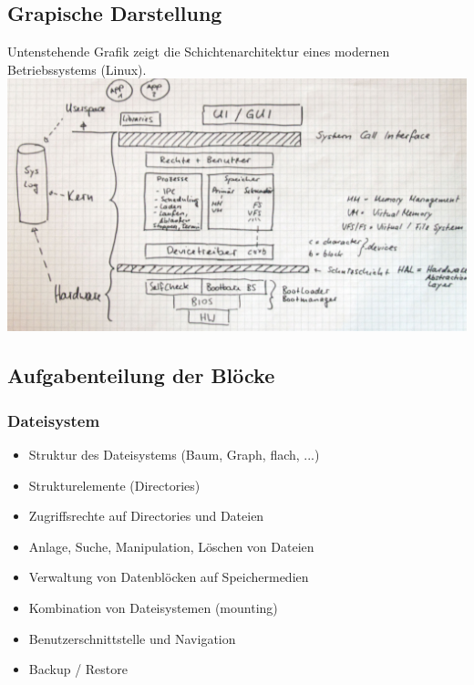 \documentclass[a4paper, 10pt]{article}
\begin{document}
\subsection{Grapische Darstellung}
Untenstehende Grafik zeigt die Schichtenarchitektur eines modernen Betriebssystems (Linux).\\
\includegraphics[scale=0.15]{Bsys.jpg}\\

\subsection{Aufgabenteilung der Bl\"ocke}
\subsubsection{Dateisystem}
\begin{itemize}
\item Struktur des Dateisystems (Baum, Graph, flach, ...)
\item Strukturelemente (Directories)
\item Zugriffsrechte auf Directories und Dateien
\item Anlage, Suche, Manipulation, L\"oschen von Dateien
\item Verwaltung von Datenbl\"ocken auf Speichermedien
\item Kombination von Dateisystemen (mounting)
\item Benutzerschnittstelle und Navigation
\item Backup / Restore
\end{itemize}
\end{document}
